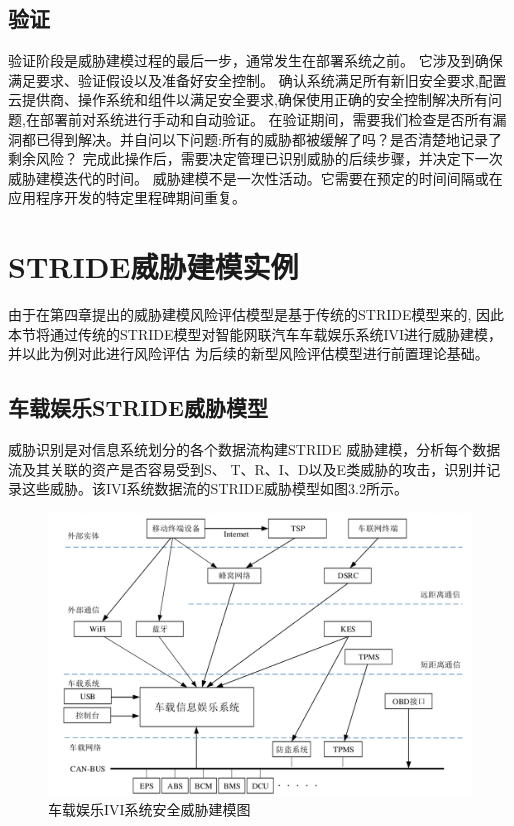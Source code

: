 \subsection{验证}

验证阶段是威胁建模过程的最后一步，通常发生在部署系统之前。 它涉及到确保满足要求、验证假设以及准备好安全控制。
确认系统满足所有新旧安全要求,配置云提供商、操作系统和组件以满足安全要求,确保使用正确的安全控制解决所有问题,在部署前对系统进行手动和自动验证。
在验证期间，需要我们检查是否所有漏洞都已得到解决。并自问以下问题:所有的威胁都被缓解了吗？是否清楚地记录了剩余风险？
完成此操作后，需要决定管理已识别威胁的后续步骤，并决定下一次威胁建模迭代的时间。
威胁建模不是一次性活动。它需要在预定的时间间隔或在应用程序开发的特定里程碑期间重复。


\section{STRIDE威胁建模实例}
由于在第四章提出的威胁建模风险评估模型是基于传统的STRIDE模型来的, 因此本节将通过传统的STRIDE模型对智能网联汽车车载娱乐系统IVI进行威胁建模，并以此为例对此进行风险评估
为后续的新型风险评估模型进行前置理论基础。

\subsection{车载娱乐STRIDE威胁模型}
威胁识别是对信息系统划分的各个数据流构建STRIDE
威胁建模，分析每个数据流及其关联的资产是否容易受到S、 T、R、I、D以及E类威胁的攻击，识别并记录这些威胁。该IVI系统数据流的STRIDE威胁模型如图3.2所示。
\begin{figure}
  \centering
  \includegraphics[scale=0.6]{resources/img/i33.png}
  \caption{车载娱乐IVI系统安全威胁建模图}
\end{figure}
